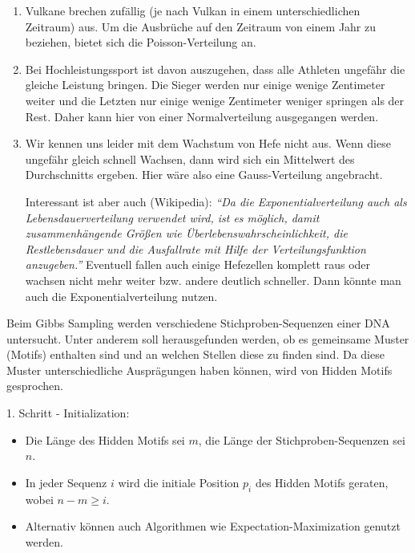 \documentclass{homework}
\date{Montag, dem 14. Januar 2013}
\author{Stefan Meißner (4279113) und Niels Hoppe (4356370)}
\begin{document}
\maketitle
\begin{enumerate} 

\begin{enumerate}
\item 
Vulkane brechen zufällig (je nach Vulkan in einem unterschiedlichen Zeitraum) aus. 
Um die Ausbrüche auf den Zeitraum von einem Jahr zu beziehen, bietet sich die Poisson-Verteilung an.
\item 
Bei Hochleistungssport ist davon auszugehen, dass alle Athleten ungefähr die gleiche Leistung bringen.
Die Sieger werden nur einige wenige Zentimeter weiter und die Letzten nur einige wenige Zentimeter weniger springen als der Rest.
Daher kann hier von einer Normalverteilung ausgegangen werden.
\item
Wir kennen uns leider mit dem Wachstum von Hefe nicht aus.
Wenn diese ungefähr gleich schnell Wachsen, dann wird sich ein Mittelwert des Durchschnitts ergeben.
Hier wäre also eine Gauss-Verteilung angebracht.

Interessant ist aber auch (Wikipedia):
\textit{"`Da die Exponentialverteilung auch als Lebensdauerverteilung verwendet wird, ist es möglich,
damit zusammenhängende Größen wie Überlebenswahrscheinlichkeit,
die Restlebensdauer und die Ausfallrate mit Hilfe der Verteilungsfunktion anzugeben."'}
Eventuell fallen auch einige Hefezellen komplett raus oder wachsen nicht mehr weiter bzw. andere deutlich schneller.
Dann könnte man auch die Exponentialverteilung nutzen.
\end{enumerate}


Beim Gibbs Sampling werden verschiedene Stichproben-Sequenzen einer DNA untersucht.
Unter anderem soll herausgefunden werden, ob es gemeinsame Muster (Motifs) enthalten sind und an welchen Stellen diese zu finden sind.
Da diese Muster unterschiedliche Ausprägungen haben können, wird von Hidden Motifs gesprochen.

1. Schritt - Initialization:
\begin{itemize}
	\item Die Länge des Hidden Motifs sei $m$, die Länge der Stichproben-Sequenzen sei $n$.
	\item In jeder Sequenz $i$ wird die initiale Position $p_i$ des Hidden Motifs geraten, wobei $n-m \geq i$.
	\item Alternativ können auch Algorithmen wie Expectation-Maximization genutzt werden.
\end{itemize}


\end{enumerate}
\end{document}
